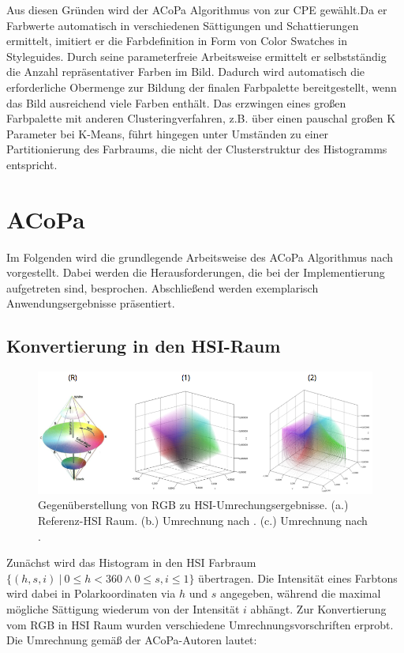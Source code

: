 \documentclass[11pt,a4paper,bibliography=totoc,twocolumn]{scrartcl}
\begin{document}
Aus diesen Gründen wird der ACoPa Algorithmus von \citet{acopa} zur CPE gewählt.Da er Farbwerte automatisch in verschiedenen Sättigungen und Schattierungen ermittelt, imitiert er die Farbdefinition in Form von Color Swatches in Styleguides. Durch seine parameterfreie Arbeitsweise ermittelt er selbstständig die Anzahl repräsentativer Farben im Bild. Dadurch wird automatisch die erforderliche Obermenge zur Bildung der finalen Farbpalette bereitgestellt, wenn das Bild ausreichend viele Farben enthält. Das erzwingen eines großen Farbpalette mit anderen Clusteringverfahren, z.B. über einen pauschal großen K Parameter bei K-Means, führt hingegen unter Umständen zu einer Partitionierung des Farbraums, die nicht der Clusterstruktur des Histogramms entspricht.

\section{ACoPa}

Im Folgenden wird die grundlegende Arbeitsweise des ACoPa Algorithmus nach \citet{acopa} vorgestellt. Dabei werden die Herausforderungen, die bei der Implementierung aufgetreten sind, besprochen. Abschließend werden exemplarisch Anwendungsergebnisse präsentiert.

\subsection{Konvertierung in den HSI-Raum}

\begin{figure}
\centering
\includegraphics[width=1\textwidth]{img/hsi_conversion.png}
\caption{Gegenüberstellung von RGB zu HSI-Umrechungsergebnisse. (a.) Referenz-HSI Raum. (b.) Umrechnung nach \citep{acopa}. (c.) Umrechnung nach \citep{colorimage}.}
\label{fig:hsi_conversion}
\end{figure}

Zunächst wird das Histogram in den HSI Farbraum $\{(h, s, i) \ | \ 0 \leq h < 360 \wedge 0 \leq s, i \leq 1\}$ übertragen. Die Intensität eines Farbtons wird dabei in Polarkoordinaten via $h$ und $s$ angegeben, während die maximal mögliche Sättigung wiederum von der Intensität $i$ abhängt. Zur Konvertierung vom RGB in HSI Raum wurden verschiedene Umrechnungsvorschriften erprobt. Die Umrechnung gemäß der ACoPa-Autoren lautet:
\end{document}
